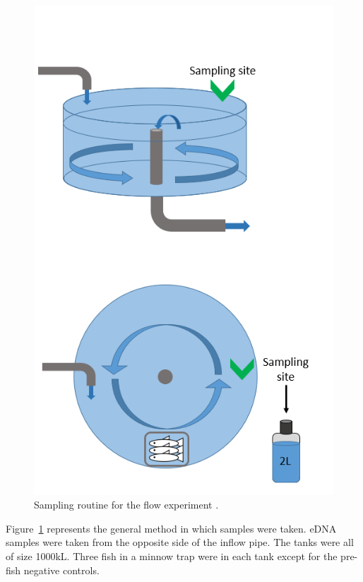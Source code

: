 \begin{figure}[H]
\includegraphics[scale=0.8]{Chapter4Images/flowsamplingroutinefixed.png}
\caption{Sampling routine for the flow experiment \citep{berg}.}
\label{fig:flowsamplingroutine}
\end{figure}

Figure~\ref{fig:flowsamplingroutine} represents the general method in which samples were taken. eDNA samples were taken from the opposite side of the inflow pipe. The tanks were all of size 1000kL. Three fish in a minnow trap were in each tank except for the pre-fish negative controls.



